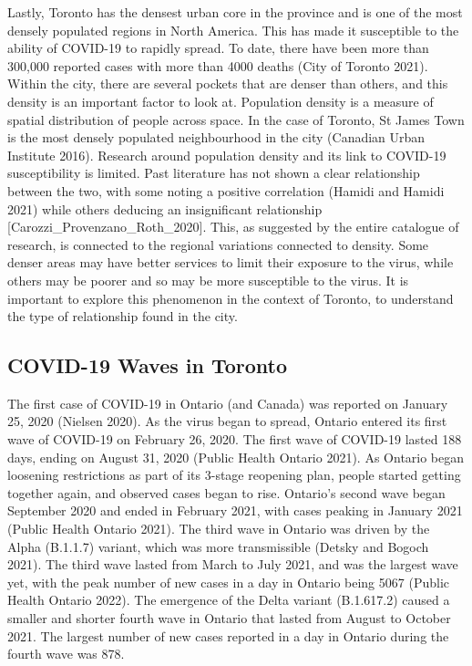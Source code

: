 \documentclass[]{article}
\begin{document}
Lastly, Toronto has the densest urban core in the province and is one of
the most densely populated regions in North America. This has made it
susceptible to the ability of COVID-19 to rapidly spread. To date, there
have been more than 300,000 reported cases with more than 4000 deaths
(City of Toronto 2021). Within the city, there are several pockets that
are denser than others, and this density is an important factor to look
at. Population density is a measure of spatial distribution of people
across space. In the case of Toronto, St James Town is the most densely
populated neighbourhood in the city (Canadian Urban Institute 2016).
Research around population density and its link to COVID-19
susceptibility is limited. Past literature has not shown a clear
relationship between the two, with some noting a positive correlation
(Hamidi and Hamidi 2021) while others deducing an insignificant
relationship {[}Carozzi\_Provenzano\_Roth\_2020{]}. This, as suggested
by the entire catalogue of research, is connected to the regional
variations connected to density. Some denser areas may have better
services to limit their exposure to the virus, while others may be
poorer and so may be more susceptible to the virus. It is important to
explore this phenomenon in the context of Toronto, to understand the
type of relationship found in the city.

\hypertarget{covid-19-waves-in-toronto}{%
\subsection{COVID-19 Waves in Toronto}\label{covid-19-waves-in-toronto}}

The first case of COVID-19 in Ontario (and Canada) was reported on
January 25, 2020 (Nielsen 2020). As the virus began to spread, Ontario
entered its first wave of COVID-19 on February 26, 2020. The first wave
of COVID-19 lasted 188 days, ending on August 31, 2020 (Public Health
Ontario 2021). As Ontario began loosening restrictions as part of its
3-stage reopening plan, people started getting together again, and
observed cases began to rise. Ontario's second wave began September 2020
and ended in February 2021, with cases peaking in January 2021 (Public
Health Ontario 2021). The third wave in Ontario was driven by the Alpha
(B.1.1.7) variant, which was more transmissible (Detsky and Bogoch
2021). The third wave lasted from March to July 2021, and was the
largest wave yet, with the peak number of new cases in a day in Ontario
being 5067 (Public Health Ontario 2022). The emergence of the Delta
variant (B.1.617.2) caused a smaller and shorter fourth wave in Ontario
that lasted from August to October 2021. The largest number of new cases
reported in a day in Ontario during the fourth wave was 878.
\end{document}
